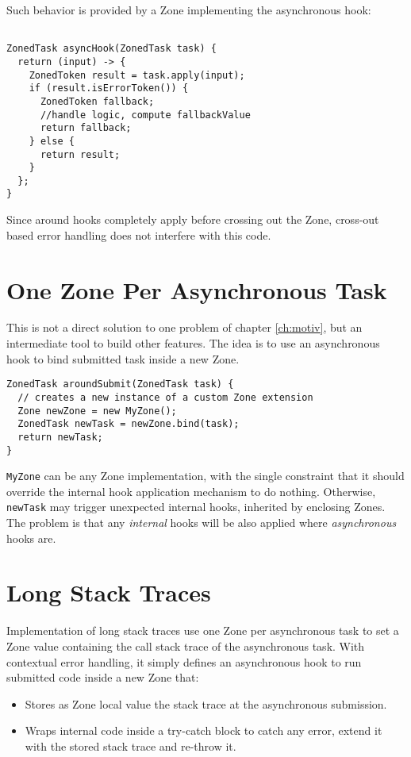 Such behavior is provided by a Zone implementing the asynchronous hook:

\begin{lstlisting}

ZonedTask asyncHook(ZonedTask task) {
  return (input) -> {
    ZonedToken result = task.apply(input);
    if (result.isErrorToken()) {
      ZonedToken fallback;
      //handle logic, compute fallbackValue
      return fallback;
    } else {
      return result;
    }
  };
}
\end{lstlisting}

Since around hooks completely apply before crossing out the Zone, cross-out based error handling does not interfere with this code.

\section{One Zone Per Asynchronous Task}

This is not a direct solution to one problem of chapter \ref{ch:motiv}, but an intermediate tool to build other features. The idea is to use an asynchronous hook to bind submitted task inside a new Zone.

\begin{lstlisting}
ZonedTask aroundSubmit(ZonedTask task) {
  // creates a new instance of a custom Zone extension
  Zone newZone = new MyZone();
  ZonedTask newTask = newZone.bind(task);
  return newTask;
}
\end{lstlisting}

\lstinline{MyZone} can be any Zone implementation, with the single constraint that it should override the internal hook application mechanism to do nothing. Otherwise, \lstinline{newTask} may trigger unexpected internal hooks, inherited by enclosing Zones. The problem is that any \emph{internal} hooks will be also applied where \emph{asynchronous} hooks are.

\section{Long Stack Traces}

Implementation of long stack traces use one Zone per asynchronous task to set a Zone value containing the call stack trace of the asynchronous task. With contextual error handling, it simply defines an asynchronous hook to run submitted code inside a new Zone that:
\begin{itemize}
\item Stores as Zone local value the stack trace at the asynchronous submission.
\item Wraps internal code inside a try-catch block to catch any error, extend it with the stored stack trace and re-throw it.
\end{itemize}

